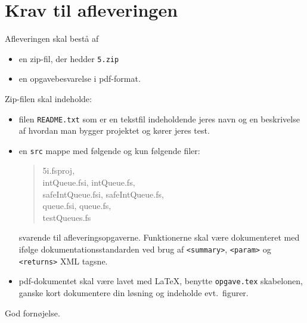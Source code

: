 \documentclass[a4paper,12pt]{article}
\newcommand{\exerciseNumber}{5}
\begin{document}
\section*{Krav til afleveringen}
Afleveringen skal bestå af
\begin{itemize}
  \item en zip-fil, der hedder \texttt{\exerciseNumber\typeLetter.zip}
  \item en opgavebesvarelse i pdf-format.
\end{itemize}
Zip-filen skal indeholde:
\begin{itemize}
\item filen \texttt{README.txt} som er en tekstfil indeholdende jeres navn og en beskrivelse af hvordan man bygger projektet og kører jeres test.
\item en \texttt{src} mappe med følgende og kun
  følgende filer:
  \begin{quote}
    5i.fsproj, \\
    intQueue.fsi, intQueue.fs,\\
    safeIntQueue.fsi, safeIntQueue.fs,\\
    queue.fsi, queue.fs,\\
    testQueues.fs\\
  \end{quote}
  svarende til afleveringsopgaverne. Funktionerne skal være dokumenteret med ifølge dokumentationsstandarden ved brug af \verb|<summary>|, \verb|<param>| og \verb|<returns>| XML tagsne.
  \item pdf-dokumentet skal være lavet med \LaTeX, benytte \lstinline[language=console]{opgave.tex} skabelonen, ganske kort dokumentere din løsning og indeholde evt.\ figurer.
\end{itemize}

\flushright God fornøjelse.
\end{document}
